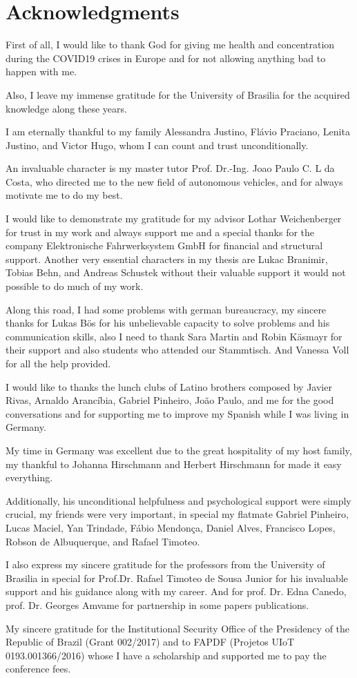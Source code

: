 \chapter*{Acknowledgments}

First of all, I would like to thank God for giving me health and concentration during the COVID19 crises in Europe and for not allowing anything bad to happen with me.

Also, I leave my immense gratitude for the University of Brasilia for the acquired knowledge along these years.


I am eternally thankful to my family Alessandra Justino, Flávio Praciano, Lenita Justino, and Victor Hugo, whom I can count and trust unconditionally.

An invaluable character is my master tutor Prof. Dr.-Ing. Joao Paulo C. L da Costa, who directed me to the new field of autonomous vehicles, and for always motivate me to do my best.

I would like to demonstrate my gratitude for my advisor Lothar Weichenberger for trust in my work and always support me and a special thanks for the company Elektronische Fahrwerksystem GmbH for financial and structural support. Another very essential characters in my thesis are Lukac Branimir, Tobias Behn, and Andreas Schustek without their valuable support it would not possible to do much of my work.

Along this road, I had some problems with german bureaucracy, my sincere thanks for Lukas Bös for his unbelievable capacity to solve problems and his communication skills, also I need to thank Sara Martin and Robin Käsmayr for their support and also students who attended our Stammtisch. And Vanessa Voll for all the help provided.

I would like to thanks the lunch clubs of Latino brothers composed by Javier Rivas, Arnaldo Arancíbia, Gabriel Pinheiro, João Paulo, and me for the good conversations and for supporting me to improve my Spanish while I was living in Germany.

My time in Germany was excellent due to the great hospitality of my host family, my thankful to Johanna Hirschmann and Herbert Hirschmann for made it easy everything. 

Additionally, his unconditional helpfulness and psychological support were simply
crucial, my friends were very important, in special my flatmate Gabriel Pinheiro, Lucas Maciel, Yan Trindade, Fábio Mendonça, Daniel Alves, Francisco Lopes, Robson de Albuquerque, and Rafael Timoteo. 

I also express my sincere gratitude for the professors from the University of Brasilia in special for Prof.Dr. Rafael Timoteo de Sousa Junior for his invaluable support and his guidance along with my career. And for prof. Dr. Edna Canedo, prof. Dr. Georges Amvame for partnership in some papers publications.

My sincere gratitude for the Institutional Security Office of the Presidency of the Republic of Brazil (Grant 002/2017) and to FAPDF (Projetos UIoT 0193.001366/2016) whose I have a scholarship and supported me to pay the conference fees. 